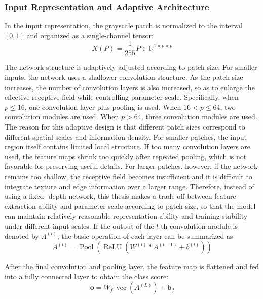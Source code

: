 \subsubsection{Input Representation and Adaptive Architecture}
\par In the input representation, the grayscale patch is normalized to the
interval $[0,1]$ and organized as a single-channel tensor:
\begin{equation}
    X(P)=\frac{1}{255}P\in\mathbb{R}^{1\times p\times p}
    \label{eq:cnn-input-method}
\end{equation}
\par The network structure is adaptively adjusted according to patch size. For
smaller inputs, the network uses a shallower convolution structure. As the
patch size increases, the number of convolution layers is also increased, so as
to enlarge the effective receptive field while controlling parameter scale.
Specifically, when $p\le 16$, one convolution layer plus pooling is used. When
$16<p\le 64$, two convolution modules are used. When $p>64$, three
convolution modules are used. The reason for this adaptive design is that
different patch sizes correspond to different spatial scales and information
density. For smaller patches, the input region itself contains limited local
structure. If too many convolution layers are used, the feature maps shrink too
quickly after repeated pooling, which is not favorable for preserving useful
details. For larger patches, however, if the network remains too shallow, the
receptive field becomes insufficient and it is difficult to integrate texture
and edge information over a larger range. Therefore, instead of using a fixed-
depth network, this thesis makes a trade-off between feature extraction ability
and parameter scale according to patch size, so that the model can maintain
relatively reasonable representation ability and training stability under
different input scales. If the output of the $l$-th convolution module is
denoted by $A^{(l)}$, the basic operation of each layer can be summarized as
\begin{equation}
    A^{(l)}=\operatorname{Pool}\!\left(\operatorname{ReLU}\!\left(W^{(l)}*A^{(l-1)}+b^{(l)}\right)\right)
    \label{eq:cnn-block-method}
\end{equation}
\par After the final convolution and pooling layer, the feature map is
flattened and fed into a fully connected layer to obtain the class score:
\begin{equation}
    \mathbf{o}=W_f\,\operatorname{vec}\!\left(A^{(L)}\right)+\mathbf{b}_f
    \label{eq:cnn-fc-method}
\end{equation}

